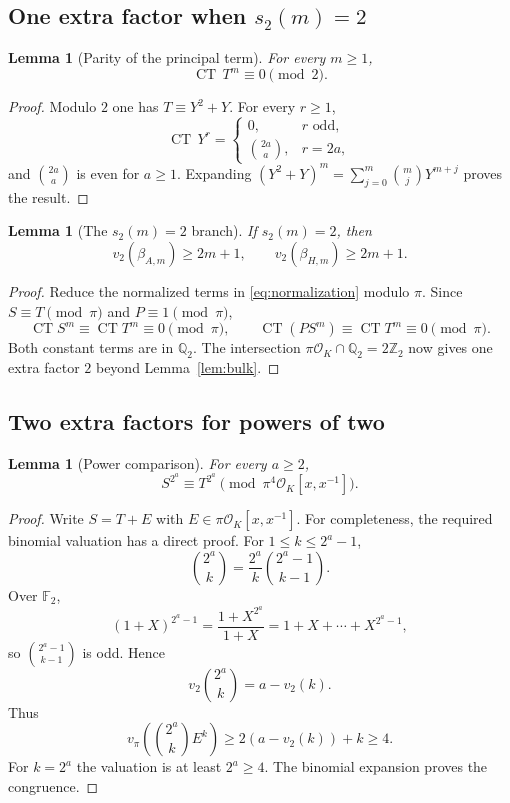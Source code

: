 \documentclass[11pt]{article}
\newtheorem{lemma}[theorem]{Lemma}
\theoremstyle{remark}\newtheorem{remark}[theorem]{Remark}
\newcommand{\CT}{\operatorname{CT}}
\newcommand{\Z}{\mathbb Z}\newcommand{\Q}{\mathbb Q}
\newcommand{\cO}{\mathcal O}\newcommand{\vp}{v_2}
\newcommand{\vpi}{v_\pi}
\begin{document}
\subsection{One extra factor when $s_2(m)=2$}

\begin{lemma}[Parity of the principal term]\label{lem:parity}
For every $m\ge1$,
\[
\CT\,T^m\equiv0\pmod2.
\]
\end{lemma}

\begin{proof}
Modulo $2$ one has $T\equiv Y^2+Y$.  For every $r\ge1$,
\[
\CT\,Y^r=
\begin{cases}
0,&r\text{ odd},\\
\binom{2a}{a},&r=2a,
\end{cases}
\]
and $\binom{2a}{a}$ is even for $a\ge1$.  Expanding
$(Y^2+Y)^m=\sum_{j=0}^{m}\binom mjY^{m+j}$ proves the result.
\end{proof}

\begin{lemma}[The $s_2(m)=2$ branch]\label{lem:pop2}
If $s_2(m)=2$, then
\[
\vp(\beta_{A,m})\ge2m+1,
\qquad
\vp(\beta_{H,m})\ge2m+1.
\]
\end{lemma}

\begin{proof}
Reduce the normalized terms in \eqref{eq:normalization} modulo $\pi$.
Since $S\equiv T\pmod\pi$ and $P\equiv1\pmod\pi$,
\[
\CT S^m\equiv\CT T^m\equiv0\pmod\pi,
\qquad
\CT(PS^m)\equiv\CT T^m\equiv0\pmod\pi.
\]
Both constant terms are in $\Q_2$.  The intersection
$\pi\cO_K\cap\Q_2=2\Z_2$ now gives one extra factor $2$ beyond
Lemma~\ref{lem:bulk}.
\end{proof}

\subsection{Two extra factors for powers of two}

\begin{lemma}[Power comparison]\label{lem:power-comparison}
For every $a\ge2$,
\[
S^{2^a}\equiv T^{2^a}\pmod{\pi^4\cO_K[x,x^{-1}]}.
\]
\end{lemma}

\begin{proof}
Write $S=T+E$ with $E\in\pi\cO_K[x,x^{-1}]$.  For completeness, the required binomial valuation has a direct proof.
For $1\le k\le2^a-1$,
\[
\binom{2^a}{k}=\frac{2^a}{k}\binom{2^a-1}{k-1}.
\]
Over $\mathbb F_2$,
\[
(1+X)^{2^a-1}=\frac{1+X^{2^a}}{1+X}
=1+X+\cdots+X^{2^a-1},
\]
so $\binom{2^a-1}{k-1}$ is odd.  Hence
\[
\vp\!\binom{2^a}{k}=a-\vp(k).
\]
Thus
\[
\vpi\!\left(\binom{2^a}{k}E^k\right)
\ge2(a-\vp(k))+k\ge4.
\]
For $k=2^a$ the valuation is at least $2^a\ge4$.  The binomial
expansion proves the congruence.
\end{proof}
\end{document}

